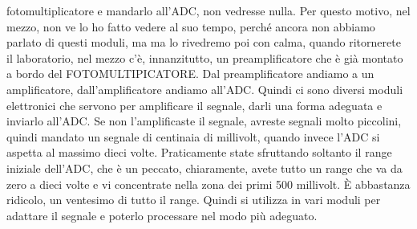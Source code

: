 fotomultiplicatore e mandarlo all'ADC, non vedresse nulla. Per questo motivo, nel mezzo, non ve lo ho fatto vedere al suo tempo, perché ancora non abbiamo parlato di questi moduli, ma ma lo rivedremo poi con calma, quando ritornerete il laboratorio, nel mezzo c'è, innanzitutto, un preamplificatore che è già montato a bordo del FOTOMULTIPICATORE. Dal preamplificatore andiamo a un amplificatore, dall'amplificatore andiamo all'ADC. Quindi ci sono diversi moduli elettronici che servono per amplificare il segnale, darli una forma adeguata e inviarlo all'ADC. Se non l'amplificaste il segnale, avreste segnali molto piccolini, quindi mandato un segnale di centinaia di millivolt, quando invece l'ADC si aspetta al massimo dieci volte. Praticamente state sfruttando soltanto il range iniziale dell'ADC, che è un peccato, chiaramente, avete tutto un range che va da zero a dieci volte e vi concentrate nella zona dei primi 500 millivolt. È abbastanza ridicolo, un ventesimo di tutto il range. Quindi si utilizza in vari moduli per adattare il segnale e poterlo processare nel modo più adeguato. 

